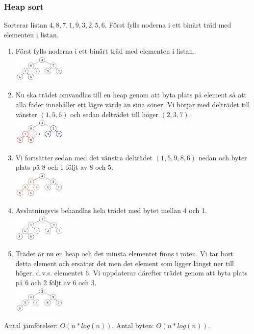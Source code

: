\documentclass{article}
\begin{document}
\begin{multicols}{2}
\subsubsection{Heap sort}
Sorterar listan $4,8,7,1,9,3,2,5,6$. Först fylls noderna i ett binärt träd med elementen i listan.
\begin{multicols}{2}
    \begin{enumerate}
        \item Först fylls noderna i ett binärt träd med elementen i listan.\\
        \includegraphics[width=0.2\textwidth]{images/heap1}
        \item Nu ska trädet omvandlas till en heap genom att byta plats på element så att alla fäder innehåller ett lägre värde än sina söner. Vi börjar med delträdet till vänster $(1,5,6)$ och sedan delträdet till höger $(2,3,7)$.\\
        \includegraphics[width=0.2\textwidth]{images/heap2}
        \item Vi fortsätter sedan med det vänstra delträdet $(1,5,9,8,6)$ nedan och byter plats på 8 och 1 följt av 8 och 5.\\
        \includegraphics[width=0.2\textwidth]{images/heap3}
        \item Avslutningsvis behandlas hela trädet med bytet mellan 4 och 1.\\
        \includegraphics[width=0.2\textwidth]{images/heap4}
        \item Trädet är nu en heap och det minsta elementet finns i roten. Vi tar bort detta element och ersätter det men det element som ligger längst ner till höger, d.v.s. elementet 6. Vi uppdaterar därefter trädet genom att byta plats på 6 och 2 följt av 6 och 3.\\
        \includegraphics[width=0.2\textwidth]{images/heap5}
    \end{enumerate}
    Antal jämförelser: $O(n*log(n))$. Antal byten: $O(n*log(n))$.
\end{multicols}


\end{multicols}
\end{document}
